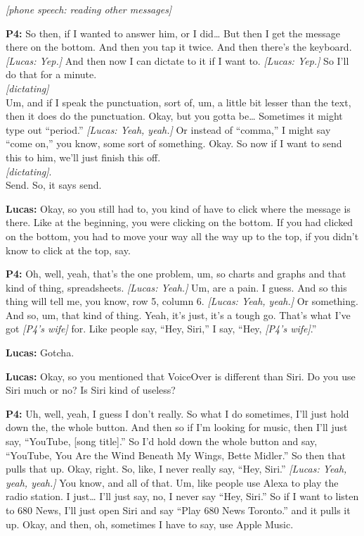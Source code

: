 \textit{[phone speech: reading other messages]}

\textbf{P4:} So then, if I wanted to answer him, or I did\ldots{} But then I get the message there on the bottom. And then you tap it twice. And then there's the keyboard. \textit{[Lucas: Yep.]} And then now I can dictate to it if I want to. \textit{[Lucas: Yep.]} So I'll do that for a minute.\\
\textit{[dictating]}\\
Um, and if I speak the punctuation, sort of, um, a little bit lesser than the text, then it does do the punctuation. Okay, but you gotta be\ldots{} Sometimes it might type out ``period.'' \textit{[Lucas: Yeah, yeah.]} Or instead of ``comma,'' I might say ``come on,'' you know, some sort of something. Okay. So now if I want to send this to him, we'll just finish this off.\\
\textit{[dictating]}.\\
Send. So, it says send.

\textbf{Lucas:} Okay, so you still had to, you kind of have to click where the message is there. Like at the beginning, you were clicking on the bottom. If you had clicked on the bottom, you had to move your way all the way up to the top, if you didn't know to click at the top, say.

\textbf{P4:} Oh, well, yeah, that's the one problem, um, so charts and graphs and that kind of thing, spreadsheets. \textit{[Lucas: Yeah.]} Um, are a pain. I guess. And so this thing will tell me, you know, row 5, column 6. \textit{[Lucas: Yeah, yeah.]} Or something. And so, um, that kind of thing. Yeah, it's just, it's a tough go. That's what I've got \textit{[P4's wife]} for. Like people say, ``Hey, Siri,'' I say, ``Hey, \textit{[P4's wife]}.''

\textbf{Lucas:} Gotcha.

\textbf{Lucas:} Okay, so you mentioned that VoiceOver is different than Siri. Do you use Siri much or no? Is Siri kind of useless?

\textbf{P4:} Uh, well, yeah, I guess I don't really. So what I do sometimes, I'll just hold down the, the whole button. And then so if I'm looking for music, then I'll just say, ``YouTube, [song title].'' So I'd hold down the whole button and say, ``YouTube, You Are the Wind Beneath My Wings, Bette Midler.'' So then that pulls that up. Okay, right. So, like, I never really say, ``Hey, Siri.'' \textit{[Lucas: Yeah, yeah, yeah.]} You know, and all of that. Um, like people use Alexa to play the radio station. I just\ldots{} I'll just say, no, I never say ``Hey, Siri.'' So if I want to listen to 680 News, I'll just open Siri and say ``Play 680 News Toronto.'' and it pulls it up. Okay, and then, oh, sometimes I have to say, use Apple Music.

